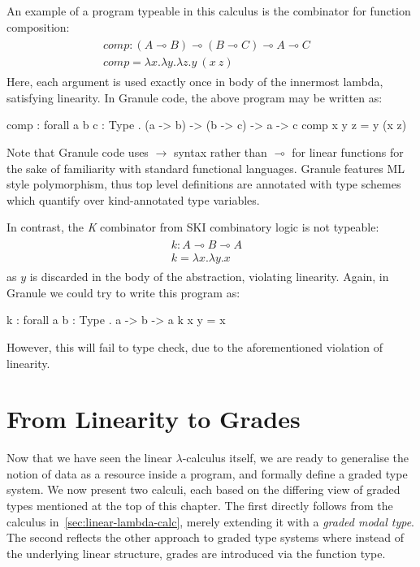 \begin{example}
  \label{example:linear-granule}
An example of a program typeable in this calculus is the combinator for function
composition: 
\begin{align*}
\begin{array}{ll}
    comp: (A \multimap B) \multimap (B \multimap C) \multimap A \multimap C &
    \\
    comp = \lambda x. \lambda y. \lambda z. y\ (x\ z) &
\end{array}  
\end{align*}
Here, each argument is used exactly once in body of the innermost lambda, satisfying 
linearity. In Granule code, the above program may be written as:
\begin{granule}
comp : forall { a b c : Type } . (a -> b) -> (b -> c) -> a -> c
comp x y z = y (x z)
\end{granule}
Note that Granule code uses $\rightarrow$ syntax rather than $\multimap$ for
linear functions for the sake of familiarity with standard functional languages.
Granule features ML style polymorphism, thus top level definitions are annotated
with type schemes which quantify over kind-annotated type variables.

In contrast, the \emph{K} combinator from SKI combinatory logic is not typeable:
\label{k-example}
\begin{align*}
  \tag{ill-typed}
\begin{array}{ll}
    k : A \multimap B \multimap A &
    \\
    k = \lambda x. \lambda y. x &
\end{array}  
\end{align*}
as $y$ is discarded in the body of the abstraction, violating linearity. Again, 
in Granule we could try to write this program as:
\begin{granule}
k : forall { a b : Type } . a -> b -> a
k x y = x
\end{granule}
However, this will fail to type check, due to the aforementioned violation of
linearity.
\end{example}

\section{From Linearity to Grades}
\label{sec:graded-linear}
Now that we have seen the linear $\lambda$-calculus itself, we are ready to
generalise the notion of data as a resource inside a program, and formally
define a graded type system. We now present two calculi, each based on the
differing view of graded types mentioned at the top of this chapter. The first
directly follows from the calculus in~\ref{sec:linear-lambda-calc}, merely
extending it with a \emph{graded modal type}. The second reflects the other
approach to graded type systems where instead of the underlying linear
structure, grades are introduced via the function type. 

